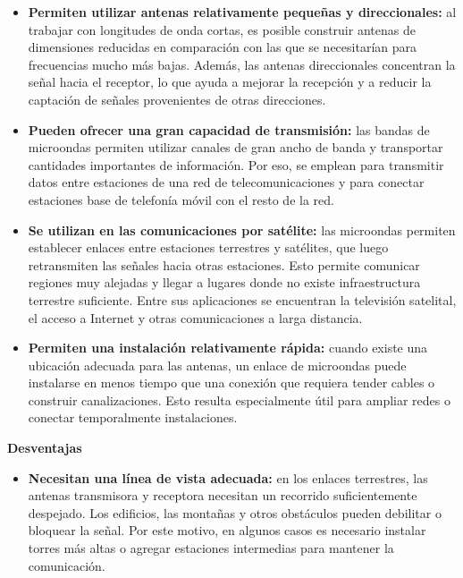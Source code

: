 \documentclass[11pt,a4paper]{article}
\begin{document}
\begin{enumerate}[label=4.\arabic*), itemsep=0.3cm]
\begin{itemize}
          \item \textbf{Permiten utilizar antenas relativamente pequeñas y direccionales:}
          al trabajar con longitudes de onda cortas, es posible construir antenas de dimensiones reducidas en comparación con las que se necesitarían para frecuencias mucho más bajas. Además, las antenas direccionales concentran la señal hacia el receptor, lo que ayuda a mejorar la recepción y a reducir la captación de señales provenientes de otras direcciones.

          \item \textbf{Pueden ofrecer una gran capacidad de transmisión:}
          las bandas de microondas permiten utilizar canales de gran ancho de banda y transportar cantidades importantes de información. Por eso, se emplean para transmitir datos entre estaciones de una red de telecomunicaciones y para conectar estaciones base de telefonía móvil con el resto de la red.

          \item \textbf{Se utilizan en las comunicaciones por satélite:}
          las microondas permiten establecer enlaces entre estaciones terrestres y satélites, que luego retransmiten las señales hacia otras estaciones. Esto permite comunicar regiones muy alejadas y llegar a lugares donde no existe infraestructura terrestre suficiente. Entre sus aplicaciones se encuentran la televisión satelital, el acceso a Internet y otras comunicaciones a larga distancia.

          \item \textbf{Permiten una instalación relativamente rápida:}
          cuando existe una ubicación adecuada para las antenas, un enlace de microondas puede instalarse en menos tiempo que una conexión que requiera tender cables o construir canalizaciones. Esto resulta especialmente útil para ampliar redes o conectar temporalmente instalaciones.
        \end{itemize}

        \textbf{Desventajas}
        \begin{itemize}
          \item \textbf{Necesitan una línea de vista adecuada:}
          en los enlaces terrestres, las antenas transmisora y receptora necesitan un recorrido suficientemente despejado. Los edificios, las montañas y otros obstáculos pueden debilitar o bloquear la señal. Por este motivo, en algunos casos es necesario instalar torres más altas o agregar estaciones intermedias para mantener la comunicación.


\end{itemize}
\end{enumerate}
\end{document}

